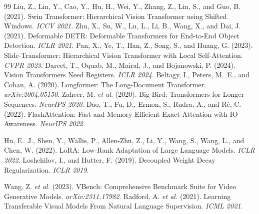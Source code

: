 \documentclass[11pt, letterpaper]{article}
\begin{document}
\begin{thebibliography}{99}
 Liu, Z., Lin, Y., Cao, Y., Hu, H., Wei, Y., Zhang, Z., Lin, S., and Guo, B. (2021). Swin Transformer: Hierarchical Vision Transformer using Shifted Windows. \textit{ICCV 2021}.
 Zhu, X., Su, W., Lu, L., Li, B., Wang, X., and Dai, J. (2021). Deformable DETR: Deformable Transformers for End-to-End Object Detection. \textit{ICLR 2021}.
 Pan, X., Ye, T., Han, Z., Song, S., and Huang, G. (2023). Slide-Transformer: Hierarchical Vision Transformer with Local Self-Attention. \textit{CVPR 2023}.
 Darcet, T., Oquab, M., Mairal, J., and Bojanowski, P. (2024). Vision Transformers Need Registers. \textit{ICLR 2024}.
 Beltagy, I., Peters, M.~E., and Cohan, A. (2020). Longformer: The Long-Document Transformer. \textit{arXiv:2004.05150}.
 Zaheer, M. \textit{et al.} (2020). Big Bird: Transformers for Longer Sequences. \textit{NeurIPS 2020}.
 Dao, T., Fu, D., Ermon, S., Rudra, A., and R\'e, C. (2022). FlashAttention: Fast and Memory-Efficient Exact Attention with IO-Awareness. \textit{NeurIPS 2022}.

 Hu, E.~J., Shen, Y., Wallis, P., Allen-Zhu, Z., Li, Y., Wang, S., Wang, L., and Chen, W. (2022). LoRA: Low-Rank Adaptation of Large Language Models. \textit{ICLR 2022}.
 Loshchilov, I., and Hutter, F. (2019). Decoupled Weight Decay Regularization. \textit{ICLR 2019}.

 Wang, Z. \textit{et al.} (2023). VBench: Comprehensive Benchmark Suite for Video Generative Models. \textit{arXiv:2311.17982}.
 Radford, A. \textit{et al.} (2021). Learning Transferable Visual Models From Natural Language Supervision. \textit{ICML 2021}.

\end{thebibliography}
\end{document}

